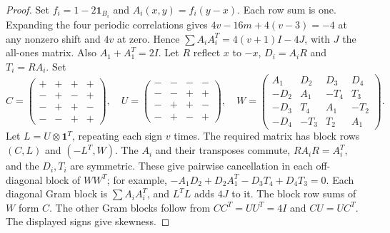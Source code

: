 \documentclass[11pt]{article}
\newcommand{\one}{\mathbf1}
\begin{document}
\begin{proof}
Set $f_i=1-2\one_{B_i}$ and $A_i(x,y)=f_i(y-x)$. Each row sum is one. Expanding the four periodic correlations gives $4v-16m+4(v-3)=-4$ at any nonzero shift and $4v$ at zero. Hence $\sum A_iA_i^T=4(v+1)I-4J$, with $J$ the all-ones matrix. Also $A_1+A_1^T=2I$. Let $R$ reflect $x$ to $-x$, $D_i=A_iR$ and $T_i=RA_i$. Set
\[
 C=\begin{pmatrix}+&+&+&+\\-&+&-&+\\-&+&+&-\\-&-&+&+\end{pmatrix},
 \quad U=\begin{pmatrix}-&-&-&-\\-&-&+&+\\-&+&+&-\\-&+&-&+\end{pmatrix},\quad
 W=\begin{pmatrix}A_1&D_2&D_3&D_4\\-D_2&A_1&-T_4&T_3\\
 -D_3&T_4&A_1&-T_2\\-D_4&-T_3&T_2&A_1\end{pmatrix}.
\]
Let $L=U\otimes\one^T$, repeating each sign $v$ times. The required matrix has block rows $(C,L)$ and $(-L^T,W)$. The $A_i$ and their transposes commute, $RA_iR=A_i^T$, and the $D_i,T_i$ are symmetric. These give pairwise cancellation in each off-diagonal block of $WW^T$; for example, $-A_1D_2+D_2A_1^T-D_3T_4+D_4T_3=0$. Each diagonal Gram block is $\sum A_iA_i^T$, and $L^TL$ adds $4J$ to it. The block row sums of $W$ form $C$. The other Gram blocks follow from $CC^T=UU^T=4I$ and $CU=UC^T$. The displayed signs give skewness.
\end{proof}
\end{document}

